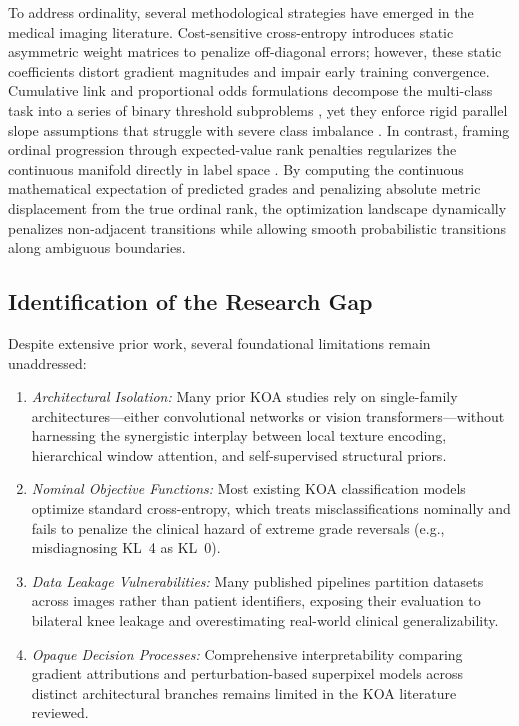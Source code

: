 \documentclass[10pt,journal]{IEEEtran}
\begin{document}
To address ordinality, several methodological strategies have emerged in the medical imaging literature. Cost-sensitive cross-entropy introduces static asymmetric weight matrices to penalize off-diagonal errors; however, these static coefficients distort gradient magnitudes and impair early training convergence. Cumulative link and proportional odds formulations decompose the multi-class task into a series of binary threshold subproblems \cite{chen2019fully}, yet they enforce rigid parallel slope assumptions that struggle with severe class imbalance \cite{johnson2019survey}. In contrast, framing ordinal progression through expected-value rank penalties regularizes the continuous manifold directly in label space \cite{chen2019fully}. By computing the continuous mathematical expectation of predicted grades and penalizing absolute metric displacement from the true ordinal rank, the optimization landscape dynamically penalizes non-adjacent transitions while allowing smooth probabilistic transitions along ambiguous boundaries.

\subsection{Identification of the Research Gap}
\label{subsec:research_gap}

Despite extensive prior work, several foundational limitations remain unaddressed:
\begin{enumerate}[leftmargin=*, label=(\roman*)]
\item \textit{Architectural Isolation:} Many prior KOA studies rely on single-family architectures---either convolutional networks or vision transformers---without harnessing the synergistic interplay between local texture encoding, hierarchical window attention, and self-supervised structural priors.
\item \textit{Nominal Objective Functions:} Most existing KOA classification models optimize standard cross-entropy, which treats misclassifications nominally and fails to penalize the clinical hazard of extreme grade reversals (e.g., misdiagnosing KL~4 as KL~0).
\item \textit{Data Leakage Vulnerabilities:} Many published pipelines partition datasets across images rather than patient identifiers, exposing their evaluation to bilateral knee leakage and overestimating real-world clinical generalizability.
\item \textit{Opaque Decision Processes:} Comprehensive interpretability comparing gradient attributions and perturbation-based superpixel models across distinct architectural branches remains limited in the KOA literature reviewed.
\end{enumerate}
\end{document}
